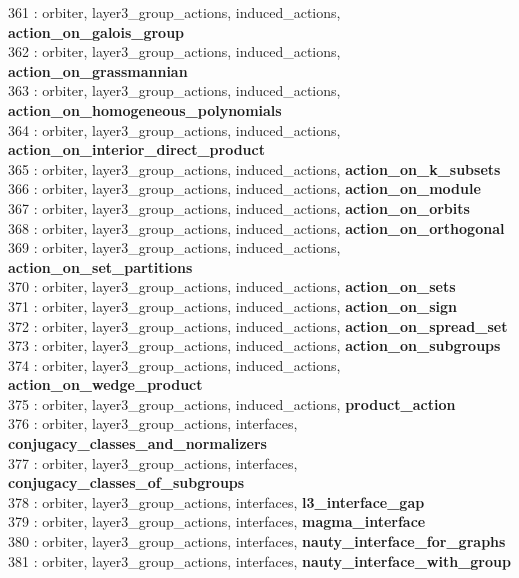 361 : orbiter, layer3\_group\_actions, induced\_actions, {\bf action\_on\_galois\_group}\\
362 : orbiter, layer3\_group\_actions, induced\_actions, {\bf action\_on\_grassmannian}\\
363 : orbiter, layer3\_group\_actions, induced\_actions, {\bf action\_on\_homogeneous\_polynomials}\\
364 : orbiter, layer3\_group\_actions, induced\_actions, {\bf action\_on\_interior\_direct\_product}\\
365 : orbiter, layer3\_group\_actions, induced\_actions, {\bf action\_on\_k\_subsets}\\
366 : orbiter, layer3\_group\_actions, induced\_actions, {\bf action\_on\_module}\\
367 : orbiter, layer3\_group\_actions, induced\_actions, {\bf action\_on\_orbits}\\
368 : orbiter, layer3\_group\_actions, induced\_actions, {\bf action\_on\_orthogonal}\\
369 : orbiter, layer3\_group\_actions, induced\_actions, {\bf action\_on\_set\_partitions}\\
370 : orbiter, layer3\_group\_actions, induced\_actions, {\bf action\_on\_sets}\\
371 : orbiter, layer3\_group\_actions, induced\_actions, {\bf action\_on\_sign}\\
372 : orbiter, layer3\_group\_actions, induced\_actions, {\bf action\_on\_spread\_set}\\
373 : orbiter, layer3\_group\_actions, induced\_actions, {\bf action\_on\_subgroups}\\
374 : orbiter, layer3\_group\_actions, induced\_actions, {\bf action\_on\_wedge\_product}\\
375 : orbiter, layer3\_group\_actions, induced\_actions, {\bf product\_action}\\
376 : orbiter, layer3\_group\_actions, interfaces, {\bf conjugacy\_classes\_and\_normalizers}\\
377 : orbiter, layer3\_group\_actions, interfaces, {\bf conjugacy\_classes\_of\_subgroups}\\
378 : orbiter, layer3\_group\_actions, interfaces, {\bf l3\_interface\_gap}\\
379 : orbiter, layer3\_group\_actions, interfaces, {\bf magma\_interface}\\
380 : orbiter, layer3\_group\_actions, interfaces, {\bf nauty\_interface\_for\_graphs}\\
381 : orbiter, layer3\_group\_actions, interfaces, {\bf nauty\_interface\_with\_group}\\
